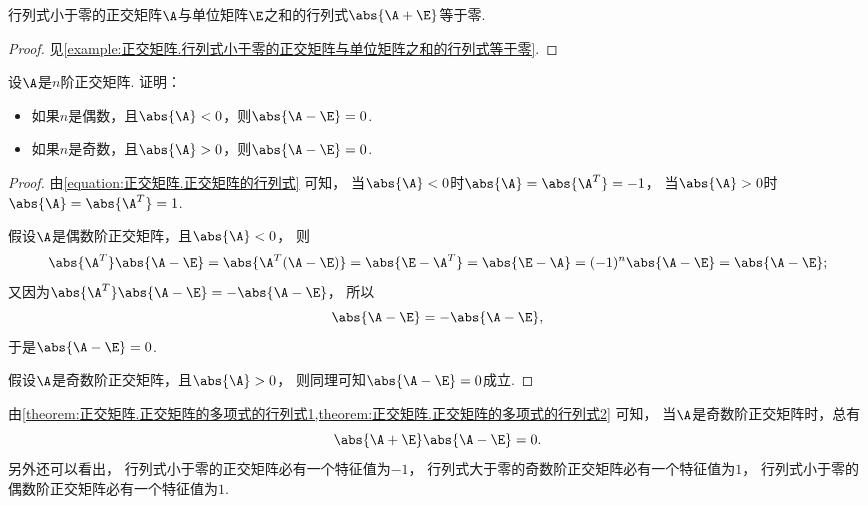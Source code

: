 \begin{proposition}\label{theorem:正交矩阵.正交矩阵的多项式的行列式1}
行列式小于零的正交矩阵\(\A\)与单位矩阵\(\E\)之和的行列式\(\abs{\A+\E}\)等于零.
\begin{proof}
见\cref{example:正交矩阵.行列式小于零的正交矩阵与单位矩阵之和的行列式等于零}.
\end{proof}
\end{proposition}
\begin{proposition}\label{theorem:正交矩阵.正交矩阵的多项式的行列式2}
设\(\A\)是\(n\)阶正交矩阵.
证明：\begin{itemize}
	\item 如果\(n\)是偶数，且\(\abs{\A}<0\)，则\(\abs{\A-\E} = 0\).
	\item 如果\(n\)是奇数，且\(\abs{\A}>0\)，则\(\abs{\A-\E} = 0\).
\end{itemize}
\begin{proof}
由\cref{equation:正交矩阵.正交矩阵的行列式} 可知，
当\(\abs{\A}<0\)时\(\abs{\A}=\abs{\A^T}=-1\)，
当\(\abs{\A}>0\)时\(\abs{\A}=\abs{\A^T}=1\).

假设\(\A\)是偶数阶正交矩阵，且\(\abs{\A}<0\)，
则\begin{align*}
	\abs{\A^T} \abs{\A-\E}
	= \abs{\A^T (\A-\E)}
	= \abs{\E-\A^T}
	= \abs{\E-\A}
	= (-1)^n \abs{\A-\E}
	= \abs{\A-\E};
\end{align*}
又因为\(\abs{\A^T} \abs{\A-\E} = -\abs{\A-\E}\)，
所以\begin{equation*}
	\abs{\A-\E}
	= -\abs{\A-\E},
\end{equation*}
于是\(\abs{\A-\E} = 0\).

假设\(\A\)是奇数阶正交矩阵，且\(\abs{\A}>0\)，
则同理可知\(\abs{\A-\E} = 0\)成立.
\end{proof}
\end{proposition}
\begin{remark}
由\cref{theorem:正交矩阵.正交矩阵的多项式的行列式1,theorem:正交矩阵.正交矩阵的多项式的行列式2} 可知，
当\(\A\)是奇数阶正交矩阵时，总有\[
	\abs{\A+\E} \abs{\A-\E} = 0.
\]
另外还可以看出，
行列式小于零的正交矩阵必有一个特征值为\(-1\)，
行列式大于零的奇数阶正交矩阵必有一个特征值为\(1\)，
行列式小于零的偶数阶正交矩阵必有一个特征值为\(1\).
\end{remark}

